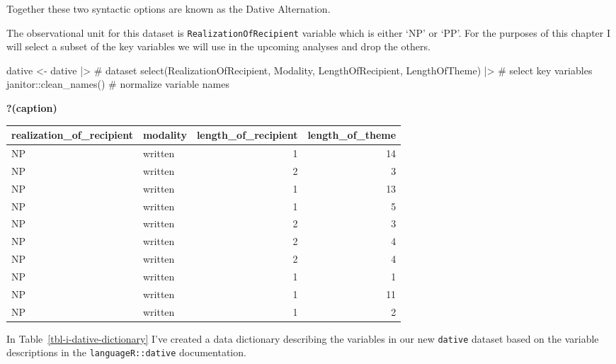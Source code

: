 \documentclass[
  letterpaper,
]{latex/krantz}
\newenvironment{Shaded}{\begin{snugshade}}{\end{snugshade}}
\newcommand{\CommentTok}[1]{\textcolor[rgb]{0.37,0.37,0.37}{#1}}
\newcommand{\FunctionTok}[1]{\textcolor[rgb]{0.28,0.35,0.67}{#1}}
\newcommand{\NormalTok}[1]{\textcolor[rgb]{0.00,0.23,0.31}{#1}}
\newcommand{\OtherTok}[1]{\textcolor[rgb]{0.00,0.23,0.31}{#1}}
\newcommand{\SpecialCharTok}[1]{\textcolor[rgb]{0.37,0.37,0.37}{#1}}
\begin{document}
Together these two syntactic options are known as the Dative
Alternation.

The observational unit for this dataset is
\texttt{RealizationOfRecipient} variable which is either `NP' or `PP'.
For the purposes of this chapter I will select a subset of the key
variables we will use in the upcoming analyses and drop the others.

\begin{Shaded}
\begin{Highlighting}[]
\NormalTok{dative }\OtherTok{\textless{}{-}} 
\NormalTok{  dative }\SpecialCharTok{|\textgreater{}} \CommentTok{\# dataset}
  \FunctionTok{select}\NormalTok{(RealizationOfRecipient, Modality, LengthOfRecipient, LengthOfTheme) }\SpecialCharTok{|\textgreater{}} \CommentTok{\# select key variables}
\NormalTok{  janitor}\SpecialCharTok{::}\FunctionTok{clean\_names}\NormalTok{() }\CommentTok{\# normalize variable names}
\end{Highlighting}
\end{Shaded}

\begin{table}

\caption{\textbf{?(caption)}}

\end{table}

\begin{tabular}{llrr}
\toprule
realization\_of\_recipient & modality & length\_of\_recipient & length\_of\_theme\\
\midrule
NP & written & 1 & 14\\
NP & written & 2 & 3\\
NP & written & 1 & 13\\
NP & written & 1 & 5\\
NP & written & 2 & 3\\
\addlinespace
NP & written & 2 & 4\\
NP & written & 2 & 4\\
NP & written & 1 & 1\\
NP & written & 1 & 11\\
NP & written & 1 & 2\\
\bottomrule
\end{tabular}

In Table~\ref{tbl-i-dative-dictionary} I've created a data dictionary
describing the variables in our new \texttt{dative} dataset based on the
variable descriptions in the \texttt{languageR::dative} documentation.
\end{document}

